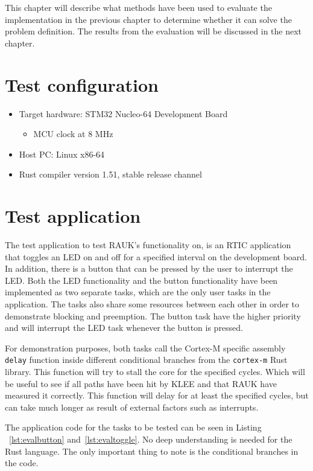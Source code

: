 This chapter will describe what methods have been used to evaluate the
implementation in the previous chapter to determine whether it can solve the
problem definition. The results from the evaluation will be discussed in
the next chapter.

\section{Test configuration}
\begin{itemize}
    \item Target hardware: STM32 Nucleo-64 Development Board
    \begin{itemize}
       \item MCU clock at 8 MHz
    \end{itemize}
    \item Host PC\@: Linux x86-64 
    \item Rust compiler version 1.51, stable release channel
\end{itemize}

\section{Test application}
The test application to test RAUK's functionality on, is an RTIC application
that toggles an LED on and off for a specified interval on the development board. In
addition, there is a button that can be pressed by the user to interrupt the
LED\@. Both the LED functionality and the button functionality have been
implemented as two separate tasks, which are the only user tasks in the
application. The tasks also share some resources between each other in order to
demonstrate blocking and preemption. The button task have the higher priority
and will interrupt the LED task whenever the button is pressed.

For demonstration purposes, both tasks call the Cortex-M specific assembly
\texttt{delay} function inside different conditional branches from the
\texttt{cortex-m} Rust library. This function will try to stall the core for
the specified cycles. Which will be useful to see if all paths have been hit by
KLEE and that RAUK have measured it correctly. This function will delay for at
least the specified cycles, but can take much longer as result of external factors
such as interrupts.

The application code for the tasks to be tested can be seen in Listing
~\ref{lst:evalbutton} and~\ref{lst:evaltoggle}. No deep understanding is
needed for the Rust language. The only important thing to note is the
conditional branches in the code.


